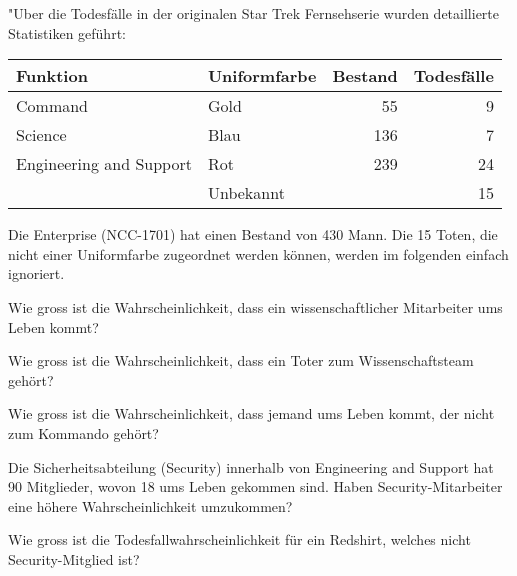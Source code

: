 "Uber die Todesfälle in der originalen Star Trek Fernsehserie wurden
detaillierte Statistiken geführt:
\begin{center}
\begin{tabular}{|l|l|r|r|}
\hline
Funktion&Uniformfarbe&Bestand&Todesfälle\\
\hline
Command&Gold&55&9\\
Science&Blau&136&7\\
Engineering and Support&Rot&239&24\\
&Unbekannt&&15\\
\hline
\end{tabular}
\end{center}
Die Enterprise (NCC-1701) hat einen Bestand von 430 Mann.
Die 15 Toten, die nicht einer Uniformfarbe zugeordnet werden können, werden
im folgenden einfach ignoriert.
\begin{teilaufgaben}
\item
Wie gross ist die Wahrscheinlichkeit, dass ein wissenschaftlicher Mitarbeiter
ums Leben kommt?
\item
Wie gross ist die Wahrscheinlichkeit, dass ein Toter zum Wissenschaftsteam
gehört?
\item
Wie gross ist die Wahrscheinlichkeit, dass jemand ums Leben kommt, der
nicht zum Kommando gehört?
\item 
Die Sicherheitsabteilung (Security) innerhalb von Engineering and Support
hat 90 Mitglieder, wovon 18 ums Leben gekommen sind.
Haben Security-Mitarbeiter eine höhere Wahrscheinlichkeit umzukommen?
\item
Wie gross ist die Todesfallwahrscheinlichkeit für ein Redshirt, welches
nicht Security-Mitglied ist?
\end{teilaufgaben}


